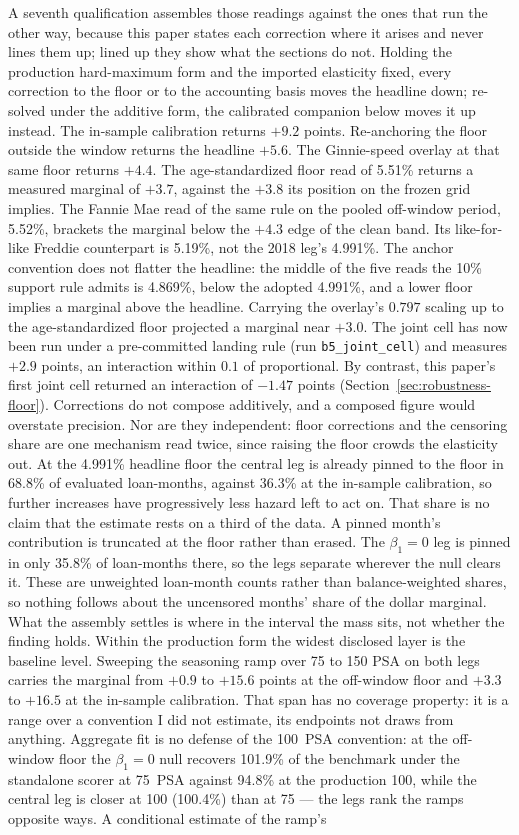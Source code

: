 \documentclass[12pt]{article}
\begin{document}
A seventh qualification assembles those readings against the ones that run the other way, because this paper states each correction where it arises and never lines them up; lined up they show what the sections do not. Holding the production hard-maximum form and the imported elasticity fixed, every correction to the floor or to the accounting basis moves the headline down; re-solved under the additive form, the calibrated companion below moves it up instead. The in-sample calibration returns $+9.2$ points. Re-anchoring the floor outside the window returns the headline $+5.6$. The Ginnie-speed overlay at that same floor returns $+4.4$. The age-standardized floor read of 5.51\% returns a measured marginal of $+3.7$, against the $+3.8$ its position on the frozen grid implies. The Fannie Mae read of the same rule on the pooled off-window period, 5.52\%, brackets the marginal below the $+4.3$ edge of the clean band. Its like-for-like Freddie counterpart is 5.19\%, not the 2018 leg's 4.991\%. The anchor convention does not flatter the headline: the middle of the five reads the 10\% support rule admits is 4.869\%, below the adopted 4.991\%, and a lower floor implies a marginal above the headline. Carrying the overlay's $0.797$ scaling up to the age-standardized floor projected a marginal near $+3.0$. The joint cell has now been run under a pre-committed landing rule (run \texttt{b5\_joint\_cell}) and measures $+2.9$ points, an interaction within $0.1$ of proportional. By contrast, this paper's first joint cell returned an interaction of $-1.47$ points (Section~\ref{sec:robustness-floor}). Corrections do not compose additively, and a composed figure would overstate precision. Nor are they independent: floor corrections and the censoring share are one mechanism read twice, since raising the floor crowds the elasticity out. At the 4.991\% headline floor the central leg is already pinned to the floor in 68.8\% of evaluated loan-months, against 36.3\% at the in-sample calibration, so further increases have progressively less hazard left to act on. That share is no claim that the estimate rests on a third of the data. A pinned month's contribution is truncated at the floor rather than erased. The $\beta_1 = 0$ leg is pinned in only 35.8\% of loan-months there, so the legs separate wherever the null clears it. These are unweighted loan-month counts rather than balance-weighted shares, so nothing follows about the uncensored months' share of the dollar marginal. What the assembly settles is where in the interval the mass sits, not whether the finding holds. Within the production form the widest disclosed layer is the baseline level. Sweeping the seasoning ramp over 75 to 150 PSA on both legs carries the marginal from $+0.9$ to $+15.6$ points at the off-window floor and $+3.3$ to $+16.5$ at the in-sample calibration. That span has no coverage property: it is a range over a convention I did not estimate, its endpoints not draws from anything. Aggregate fit is no defense of the 100~PSA convention: at the off-window floor the $\beta_1 = 0$ null recovers 101.9\% of the benchmark under the standalone scorer at 75~PSA against 94.8\% at the production 100, while the central leg is closer at 100 (100.4\%) than at 75 --- the legs rank the ramps opposite ways. A conditional estimate of the ramp's 
\end{document}
